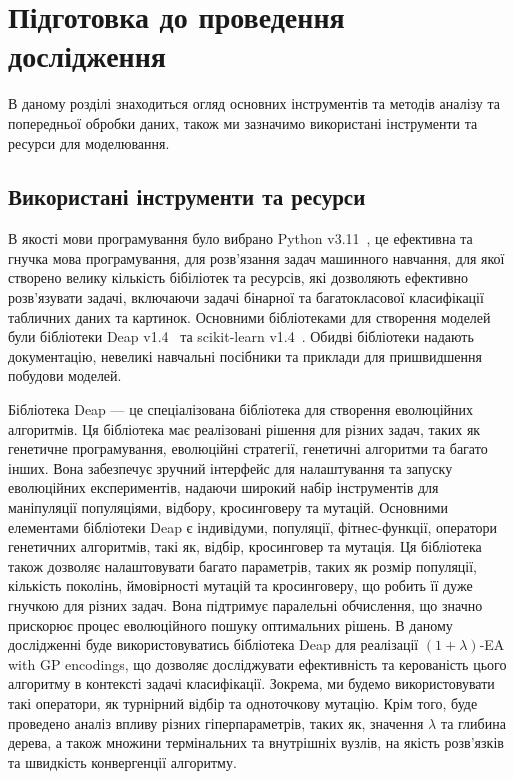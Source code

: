 \chapter{Підготовка до проведення дослідження}
\label{chap:theory}

В даному розділі знаходиться огляд основних інструментів та методів аналізу та попередньої обробки даних, також ми зазначимо використані інструменти та ресурси для моделювання.

\section{Використані інструменти та ресурси}

В якості мови програмування було вибрано Python v3.11~\cite{ct18}, це ефективна та гнучка мова програмування, для розв'язання задач машинного навчання, для якої створено велику кількість бібіліотек та ресурсів, які дозволяють ефективно розв'язувати задачі, включаючи задачі бінарної та багатокласової класифікації табличних даних та картинок. Основними бібліотеками для створення моделей були бібліотеки Deap v1.4~\cite{ct19} та scikit-learn v1.4~\cite{ct20}. Обидві бібліотеки надають документацію, невеликі навчальні посібники та приклади для пришвидшення побудови моделей.

Бібліотека Deap --- це спеціалізована бібліотека для створення еволюційних алгоритмів. Ця бібліотека має реалізовані рішення для різних задач, таких як генетичне програмування, еволюційні стратегії, генетичні алгоритми та багато інших. Вона забезпечує зручний інтерфейс для налаштування та запуску еволюційних експериментів, надаючи широкий набір інструментів для маніпуляції популяціями, відбору, кросинговеру та мутацій. Основними елементами бібліотеки Deap є індивідуми, популяції, фітнес-функції, оператори генетичних алгоритмів, такі як, відбір, кросинговер та мутація. Ця бібліотека також дозволяє налаштовувати багато параметрів, таких як розмір популяції, кількість поколінь, ймовірності мутацій та кросинговеру, що робить її дуже гнучкою для різних задач. Вона підтримує паралельні обчислення, що значно прискорює процес еволюційного пошуку оптимальних рішень. В даному дослідженні буде використовуватись бібліотека Deap для реалізації $(1+\lambda)$-EA with GP encodings, що дозволяє досліджувати ефективність та керованість цього алгоритму в контексті задачі класифікації. Зокрема, ми будемо використовувати такі оператори, як турнірний відбір та одноточкову мутацію. Крім того, буде проведено аналіз впливу різних гіперпараметрів, таких як, значення $\lambda$ та глибина дерева, а також множини термінальних та внутрішніх вузлів, на якість розв'язків та швидкість конвергенції алгоритму.

